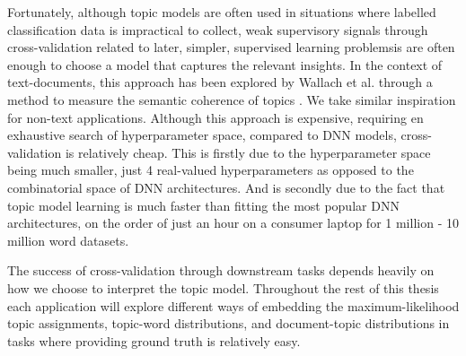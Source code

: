 
Fortunately, although topic models are often used in situations where labelled classification data is impractical to collect, weak supervisory signals through cross-validation related to later, simpler, supervised learning problemsis are often enough to choose a model that captures the relevant insights. In the context of text-documents, this approach has been explored by Wallach et al. through a method to measure the semantic coherence of topics \citep{Wallach2009}. We take similar inspiration for non-text applications. Although this approach is expensive, requiring en exhaustive search of hyperparameter space, compared to DNN models, cross-validation is relatively cheap. This is firstly due to the hyperparameter space being much smaller, just 4 real-valued hyperparameters as opposed to the combinatorial space of DNN architectures. And is secondly due to the fact that topic model learning is much faster than fitting the most popular DNN architectures, on the order of just an hour on a consumer laptop for 1 million - 10 million word datasets.

The success of cross-validation through downstream tasks depends heavily on how we choose to interpret the topic model. Throughout the rest of this thesis each application will explore different ways of embedding the maximum-likelihood topic assignments, topic-word distributions, and document-topic distributions in tasks where providing ground truth is relatively easy.